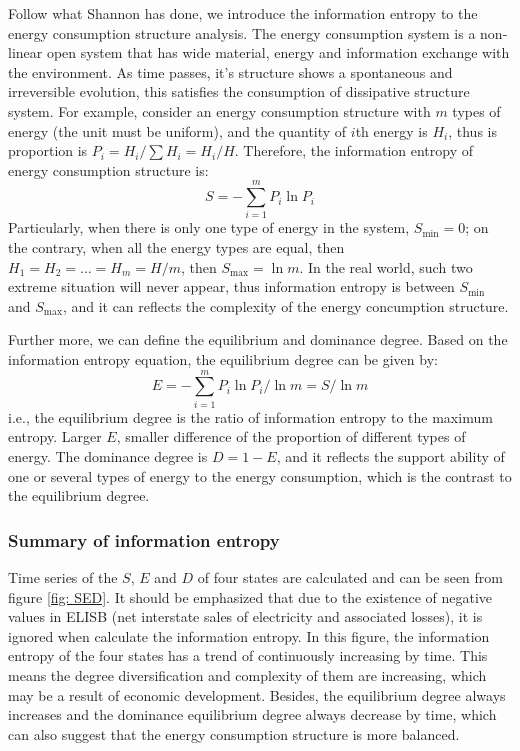 Follow what Shannon has done, we introduce the information entropy to the energy consumption structure analysis. The energy consumption system is a non-linear open system that has wide material, energy and information exchange with the environment. As time passes, it's structure shows a spontaneous and irreversible evolution, this satisfies the consumption of dissipative structure system. For example, consider an energy consumption structure with $m$ types of energy (the unit must be uniform), and the quantity of $i$th energy is ${H}_i$, thus is proportion is ${P}_i={H}_i/\sum{H_i}=H_i/H$. Therefore, the information entropy of energy consumption structure is:
\begin{equation}
    S = -\sum_{i=1}^m{P_i \ln{P_i}}
    \label{equa: ie of E}
\end{equation}
Particularly, when there is only one type of energy in the system, $S_{\mathrm{min}}=0$; on the contrary, when all the energy types are equal, then $H_1=H_2=\dots=H_m=H/m$, then $S_{\mathrm{max}}=\ln{m}$. In the real world, such two extreme situation will never appear, thus information entropy is between $S_{\mathrm{min}}$ and $S_{\mathrm{max}}$, and it can reflects the complexity of the energy concumption structure.

Further more, we can define the equilibrium and dominance degree. Based on the information entropy equation, the equilibrium degree can be given by:
\begin{equation}
    E=-\sum_{i=1}^m{P_i \ln{P_i}}/\ln{m}
    =S/\ln{m}
\end{equation}
i.e., the equilibrium degree is the ratio of information entropy to the maximum entropy. Larger $E$, smaller difference of the proportion of different types of energy. The dominance degree is $D=1-E$, and it reflects the support ability of one or several types of energy to the energy consumption, which is the contrast to the equilibrium degree. 

\subsubsection{Summary of information entropy }
Time series of the $S$, $E$ and $D$ of four states are calculated and can be seen from figure \ref{fig: SED}. It should be emphasized that due to the existence of negative values in ELISB (net interstate sales of electricity and associated losses), it is ignored when calculate the information entropy. In this figure, the information entropy of the four states has a trend of continuously increasing by time. This means the degree diversification and complexity of them are increasing, which may be a result of economic development. Besides, the equilibrium degree always increases and the dominance equilibrium degree always decrease by time, which can also suggest that the energy consumption structure is more balanced. 

